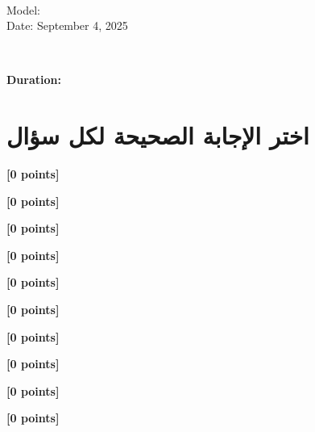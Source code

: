 \documentclass[12pt]{article}
\begin{document}
\begin{flushright}
{\Large \textbf{}}\\[0.25em]
{\normalsize \textenglish{Model: }}\\[0.1em]
{\normalsize \textenglish{Date: }{\textenglish{September 4, 2025}}}
\end{flushright}

\vspace{0.6cm}

\noindent
\begin{minipage}[t]{0.65\textwidth}
  \raggedright
  \textbf{}\\[0.3em]
\end{minipage}\hfill
\begin{minipage}[t]{0.3\textwidth}
  \raggedleft
  \textenglish{\textbf{Duration: }}
\end{minipage}

\vspace{0.9cm}

\section*{اختر الإجابة الصحيحة لكل سؤال}

\noindent 

\hfill \textbf{[0 points]}\vspace{0.6em}

\noindent 

\hfill \textbf{[0 points]}\vspace{0.6em}

\noindent 

\hfill \textbf{[0 points]}\vspace{0.6em}

\noindent 

\hfill \textbf{[0 points]}\vspace{0.6em}

\noindent 

\hfill \textbf{[0 points]}\vspace{0.6em}

\noindent 

\hfill \textbf{[0 points]}\vspace{0.6em}

\noindent 

\hfill \textbf{[0 points]}\vspace{0.6em}

\noindent 

\hfill \textbf{[0 points]}\vspace{0.6em}

\noindent 

\hfill \textbf{[0 points]}\vspace{0.6em}

\noindent 

\hfill \textbf{[0 points]}\vspace{0.6em}
\end{document}

